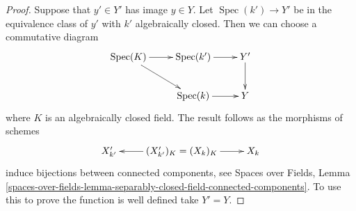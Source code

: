 \documentclass[10pt,a4paper]{amsart}
\theoremstyle{plain}
\theoremstyle{definition}
\theoremstyle{remark}
\numberwithin{equation}{subsection}
\def\Spec{\mathop{\mathrm{Spec}}}
\begin{document}
\begin{proof}
Suppose that $y' \in Y'$ has image $y \in Y$. Let $\Spec(k') \to Y'$
be in the equivalence class of $y'$ with $k'$ algebraically closed.
Then we can choose a commutative diagram
$$
\xymatrix{
\Spec(K) \ar[r] \ar[rd] &
\Spec(k') \ar[r] & Y' \ar[d] \\
& \Spec(k) \ar[r] & Y
}
$$
where $K$ is an algebraically closed field.
The result follows as the morphisms of schemes
$$
\xymatrix{
X'_{k'} & (X'_{k'})_K = (X_k)_K \ar[l] \ar[r] & X_k
}
$$
induce bijections between connected components, see
Spaces over Fields, Lemma
\ref{spaces-over-fields-lemma-separably-closed-field-connected-components}.
To use this to prove the function is well defined take $Y' = Y$.
\end{proof}
\end{document}
